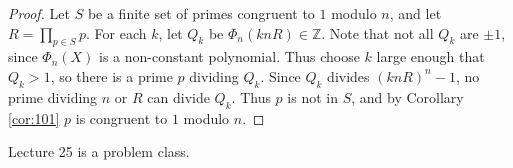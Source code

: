 \documentclass{article}
\newcommand{\Z}{\mathbb{Z}}
\newcommand{\rb}[1]{\left( #1 \right)}
\theoremstyle{definition}\newtheorem{definition}{Definition}
\theoremstyle{definition}\newtheorem{remark}[definition]{Remark}
\theoremstyle{definition}\newtheorem*{example}{Example}
\theoremstyle{definition}\newtheorem*{note}{Note}
\begin{document}
\begin{proof}
Let $ S $ be a finite set of primes congruent to $ 1 $ modulo $ n $, and let $ R = \prod_{p \in S} p $. For each $ k $, let $ Q_k $ be $ \Phi_n\rb{knR} \in \Z $. Note that not all $ Q_k $ are $ \pm 1 $, since $ \Phi_n\rb{X} $ is a non-constant polynomial. Thus choose $ k $ large enough that $ Q_k > 1 $, so there is a prime $ p $ dividing $ Q_k $. Since $ Q_k $ divides $ \rb{knR}^n - 1 $, no prime dividing $ n $ or $ R $ can divide $ Q_k $. Thus $ p $ is not in $ S $, and by Corollary \ref{cor:101} $ p $ is congruent to $ 1 $ modulo $ n $.
\end{proof}


Lecture 25 is a problem class.
\end{document}
